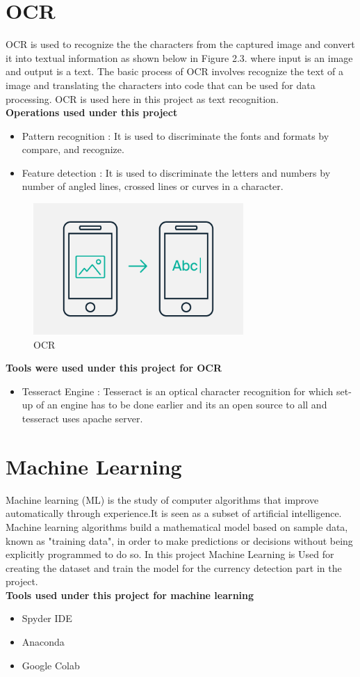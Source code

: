 \section{OCR}
\noindent OCR is used to recognize the the characters from the captured image and convert it into textual information as shown below in Figure 2.3. where input is an image and output is a text. The basic process of OCR involves recognize the text of a image and translating the characters into code that can be used for data processing.
OCR is used here in this project as text recognition.\citeauthor{9020104}\\
\textbf{Operations used under this project}
\begin{itemize}
    \item Pattern recognition : It is used to discriminate the fonts and formats by compare, and recognize.
    \item Feature detection : It is used to discriminate the letters and numbers by number of angled lines, crossed lines or curves in a character.
\end{itemize}
\begin{figure}[h!]
	\centering
	\includegraphics[width=80mm]{CHAPTERS/ocr.png}
	\caption{OCR}
\end{figure}
\noindent
\textbf{Tools were used under this project for OCR}
\begin{itemize}
    \item Tesseract Engine : Tesseract is an optical character recognition for which set-up of an engine has to be done earlier and its an open source to all and tesseract uses apache server.\citeauthor{9020103}
\end{itemize}
\section{Machine Learning}
\noindent Machine learning (ML) is the study of computer algorithms that improve automatically through experience.It is seen as a subset of artificial intelligence. Machine learning algorithms build a mathematical model based on sample data, known as "training data", in order to make predictions or decisions without being explicitly programmed to do so. In this project Machine Learning is Used for creating the dataset and train the model for the currency detection part in the project.\citeauthor{9020108}\\
\newpage
\textbf{Tools used under this project for machine learning}
\begin{itemize}
    \item Spyder IDE
    \item Anaconda
    \item Google Colab
\end{itemize}
